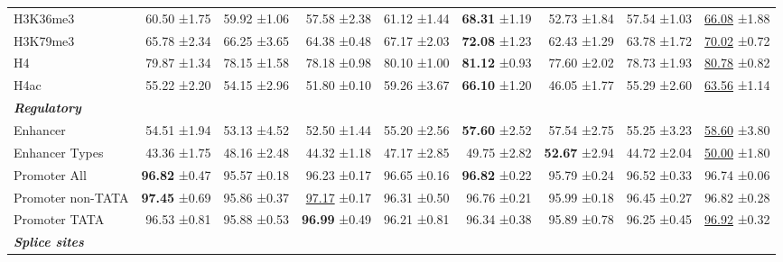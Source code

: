 \begin{table}[h]
{\begin{tabular}{lrrrr>{\columncolor{low}}rrrr}
    H3K36me3        & 60.50 \small{±1.75}  &  59.92 \small{±1.06} &  57.58 \small{±2.38} &  61.12 \small{±1.44} &  \textbf{68.31} \small{±1.19} & 52.73 \small{±1.84} & 57.54 \small{±1.03} & \underline{66.08} \small{±1.88} \\
    H3K79me3        & 65.78 \small{±2.34}  &  66.25 \small{±3.65} &  64.38 \small{±0.48} &  67.17 \small{±2.03} &  \textbf{72.08} \small{±1.23} & 62.43 \small{±1.29} & 63.78 \small{±1.72} & \underline{70.02} \small{±0.72} \\
    H4              & 79.87 \small{±1.34}  &  78.15 \small{±1.58} &  78.18 \small{±0.98} &  80.10 \small{±1.00} &  \textbf{81.12} \small{±0.93} & 77.60 \small{±2.02} & 78.73 \small{±1.93} & \underline{80.78} \small{±0.82} \\
    H4ac            & 55.22 \small{±2.20}  &  54.15 \small{±2.96} &  51.80 \small{±0.10} &  59.26 \small{±3.67} &  \textbf{66.10} \small{±1.20} & 46.05 \small{±1.77} & 55.29 \small{±2.60} & \underline{63.56} \small{±1.14} \\
    \midrule
    \rowcolor{titlebg} \textit{\textbf{Regulatory}} & & & & & & & & \\
    \midrule
    Enhancer     & 54.51 \small{±1.94}  &  53.13 \small{±4.52} &  52.50 \small{±1.44} &  55.20 \small{±2.56} &  \textbf{57.60} \small{±2.52} & 57.54 \small{±2.75} & 55.25 \small{±3.23} & \underline{58.60} \small{±3.80} \\
    Enhancer Types & 43.36 \small{±1.75}  &  48.16 \small{±2.48} &  44.32 \small{±1.18} &  47.17 \small{±2.85} &  49.75 \small{±2.82} & \textbf{52.67} \small{±2.94} & 44.72 \small{±2.04} & \underline{50.00} \small{±1.80} \\
    Promoter All   & \textbf{96.82} \small{±0.47}  &  95.57 \small{±0.18} &  96.23 \small{±0.17} &  96.65 \small{±0.16} &  \textbf{96.82} \small{±0.22} & 95.79 \small{±0.24} & 96.52 \small{±0.33} & 96.74 \small{±0.06}\\
    Promoter non-TATA & \textbf{97.45} \small{±0.69}  &  95.86 \small{±0.37} &  \underline{97.17} \small{±0.17} &  96.31 \small{±0.50} &  96.76 \small{±0.21} & 95.99 \small{±0.18} & 96.45 \small{±0.27} & 96.82 \small{±0.28}\\
    Promoter TATA  & 96.53 \small{±0.81}  &  95.88 \small{±0.53} &  \textbf{96.99} \small{±0.49} &  96.21 \small{±0.81} &  96.34 \small{±0.38} & 95.89 \small{±0.78} & 96.25 \small{±0.45} & \underline{96.92} \small{±0.32} \\
    \midrule
    \rowcolor{titlebg} \textit{\textbf{Splice sites}} & & & & & & & \\

\end{tabular}}
\end{table}

